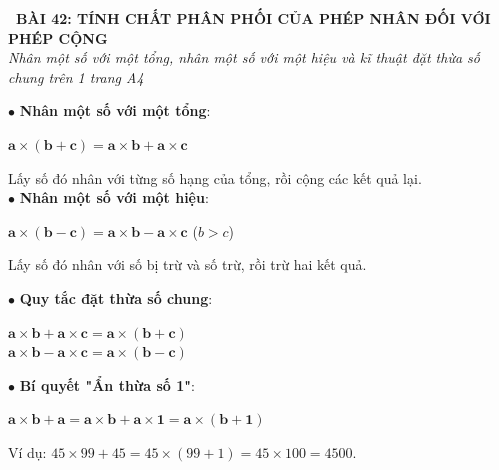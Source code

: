 \documentclass[14pt,a4paper,oneside]{extbook}
\begin{document}
\noindent
\begin{tcolorbox}[
  enhanced,
  colback=teal!8!white,
  colframe=teal!80!black,
  arc=3mm, boxrule=1pt,
  left=3mm, right=3mm, top=2mm, bottom=2mm,
  halign=center
]
  {\Large\bfseries\color{teal!90!black}\faBookmark\ BÀI 42: TÍNH CHẤT PHÂN PHỐI CỦA PHÉP NHÂN ĐỐI VỚI PHÉP CỘNG}\\[1.5pt]
  {\footnotesize\itshape\color{black!75} Nhân một số với một tổng, nhân một số với một hiệu và kĩ thuật đặt thừa số chung trên 1 trang A4}
\end{tcolorbox}

\vspace{2mm}

\noindent
\begin{minipage}[t]{0.49\textwidth}
  \begin{tcolorbox}[
    enhanced,
    title={\footnotesize\bfseries\color{white}\faFolderOpen\ 1. Chiều xuôi: Khai triển tổng, hiệu},
    colback=blue!2!white,
    colframe=blue!75!black,
    arc=2.5mm, boxrule=0.8pt, top=1.8mm, bottom=1.8mm, left=2mm, right=2mm
  ]
    \footnotesize
    $\bullet$ \textbf{Nhân một số với một tổng}:
    \begin{center}
      $\mathbf{a \times (b + c) = a \times b + a \times c}$
    \end{center}
    Lấy số đó nhân với từng số hạng của tổng, rồi cộng các kết quả lại.\\
    $\bullet$ \textbf{Nhân một số với một hiệu}:
    \begin{center}
      $\mathbf{a \times (b - c) = a \times b - a \times c}$ \quad ($b > c$)
    \end{center}
    Lấy số đó nhân với số bị trừ và số trừ, rồi trừ hai kết quả.
  \end{tcolorbox}
\end{minipage}%
\hfill
\begin{minipage}[t]{0.49\textwidth}
  \begin{tcolorbox}[
    enhanced,
    title={\footnotesize\bfseries\color{white}\faKey\ 2. Chiều ngược: Đặt thừa số chung},
    colback=teal!2!white,
    colframe=teal!75!black,
    arc=2.5mm, boxrule=0.8pt, top=1.8mm, bottom=1.8mm, left=2mm, right=2mm
  ]
    \footnotesize
    $\bullet$ \textbf{Quy tắc đặt thừa số chung}:
    \begin{center}
      $\mathbf{a \times b + a \times c = a \times (b + c)}$\\
      $\mathbf{a \times b - a \times c = a \times (b - c)}$
    \end{center}
    $\bullet$ \textbf{Bí quyết "Ẩn thừa số 1"}:
    \begin{center}
      $\mathbf{a \times b + a = a \times b + a \times 1 = a \times (b + 1)}$
    \end{center}
    Ví dụ: $45 \times 99 + 45 = 45 \times (99 + 1) = 45 \times 100 = 4500$.
  \end{tcolorbox}
\end{minipage}
\end{document}
